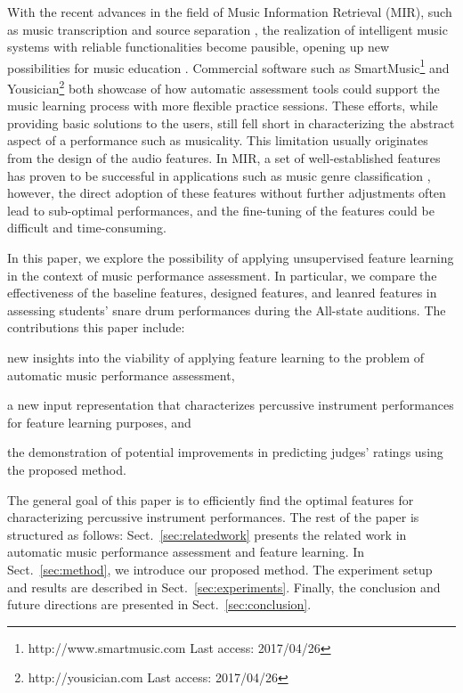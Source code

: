 \documentclass{article}
\begin{document}
With the recent advances in the field of Music Information Retrieval (MIR), such as music transcription \cite{Benetos2013} and source separation \cite{Huang2014}, the realization of intelligent music systems with reliable functionalities become pausible, opening up new possibilities for music education \cite{Dittmar2012}. Commercial software such as SmartMusic\footnote{http://www.smartmusic.com Last access: 2017/04/26} and Yousician\footnote{http://yousician.com Last access: 2017/04/26} both showcase of how automatic assessment tools could support the music learning process with more flexible practice sessions. These efforts, while providing basic solutions to the users, still fell short in characterizing the abstract aspect of a performance such as musicality. This limitation usually originates from the design of the audio features. In MIR, a set of well-established features has proven to be successful in applications such as music genre classification \cite{Tzanetakis2002}, however, the direct adoption of these features without further adjustments often lead to sub-optimal performances, and the fine-tuning of the features could be difficult and time-consuming.

In this paper, we explore the possibility of applying unsupervised feature learning in the context of music performance assessment. In particular, we compare the effectiveness of the baseline features, designed features, and leanred features in assessing students' snare drum performances during the All-state auditions. The contributions this paper include:
\begin{inparaenum}[(i)]
	\item   new insights into the viability of applying feature learning to the problem of automatic music performance assessment, 
    \item   a new input representation that characterizes percussive instrument performances for feature learning purposes, and 
    \item   the demonstration of potential improvements in predicting judges' ratings using the proposed method.
\end{inparaenum} 
The general goal of this paper is to efficiently find the optimal features for characterizing percussive instrument performances. The rest of the paper is structured as follows: Sect.~\ref{sec:relatedwork} presents the related work in automatic music performance assessment and feature learning. In Sect.~\ref{sec:method}, we introduce our proposed method. The experiment setup and results are described in Sect.~\ref{sec:experiments}. Finally, the conclusion and future directions are presented in Sect.~\ref{sec:conclusion}.
\end{document}
